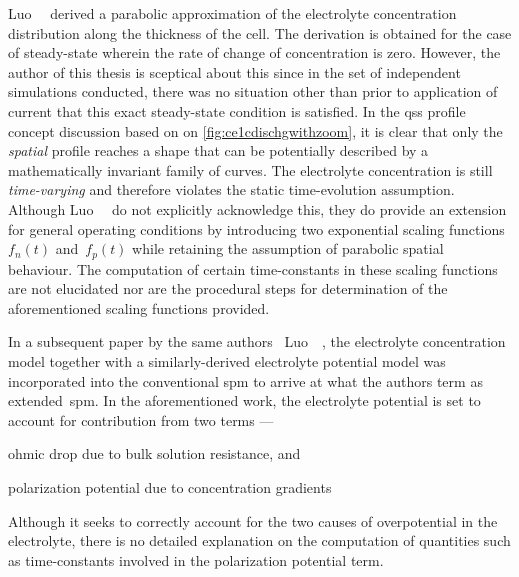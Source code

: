 Luo~\etal~\cite{Luo2013} derived  a parabolic  approximation of  the electrolyte
concentration  distribution along  the  thickness of  the  cell. The  derivation
is  obtained  for  the case  of  steady-state  wherein  the  rate of  change  of
concentration  is  zero.  However,  the  author  of  this  thesis  is  sceptical
about  this  since  in  the  set of  independent  simulations  conducted,  there
was  no  situation  other  than  prior  to  application  of  current  that  this
exact  steady-state condition  is satisfied.  In the  \gls{qss} profile  concept
discussion based on on \cref{fig:ce1cdischgwithzoom},  it is clear that only the
\emph{spatial} profile  reaches a shape that  can be potentially described  by a
mathematically  invariant family  of  curves. The  electrolyte concentration  is
still  \emph{time-varying}  and  therefore violates  the  static  time-evolution
assumption.  Although  Luo~\etal~\cite{Luo2013}  do not  explicitly  acknowledge
this,  they  do  provide  an  extension  for  general  operating  conditions  by
introducing  two  exponential   scaling  functions~$f_n(t)$  and~$f_p(t)$  while
retaining  the assumption  of parabolic  spatial behaviour.  The computation  of
certain time-constants in these scaling functions are not elucidated nor are the
procedural  steps  for determination  of  the  aforementioned scaling  functions
provided.


In a  subsequent paper  by the  same authors  \ie~Luo~\etal~\cite{Luo2013a}, the
electrolyte concentration  model together  with a  similarly-derived electrolyte
potential model  was incorporated into  the conventional \gls{spm} to  arrive at
what the  authors term  as extended~\gls{spm}. In  the aforementioned  work, the
electrolyte potential is set to account for contribution from two terms ---
\begin{enumerate*}[label=\emph{\alph*})]
    \item ohmic drop due to bulk solution resistance, and
    \item polarization potential due to concentration gradients
\end{enumerate*}
Although it  seeks to correctly account  for the two causes  of overpotential in
the  electrolyte,  there  is  no  detailed explanation  on  the  computation  of
quantities such as time-constants involved in the polarization potential term.

